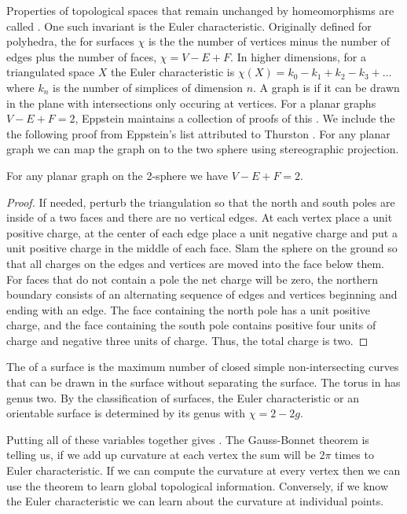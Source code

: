 Properties of topological spaces that remain unchanged by homeomorphisms are called
. One such invariant is the Euler characteristic.
Originally defined for polyhedra, the  for surfaces $\chi$ is the 
the number of vertices minus the number of edges plus  the number of faces, $\chi=V-E+F.$
In higher dimensions, for a triangulated space $X$ the Euler characteristic is 
$\chi(X)=k_0-k_1+k_2-k_3+\ldots$ where $k_n$ is the number of simplices of dimension $n.$
A  graph  is  if it can be drawn in the plane with intersections only occuring
at vertices.
For a planar graphs $V-E+F=2$, Eppstein maintains a collection of proofs of this \cite{eppstein-proofs}.
We include the the following proof from Eppstein's list attributed to Thurston
 \cite{thurston}. For any planar graph we can map the graph on to the two sphere
 using stereographic projection.
 
\begin{theorem}\label{thm:euler}
For any planar graph on the 2-sphere we have $V-E+F=2.$
\end{theorem}

\begin{proof}
If needed, perturb the triangulation so that the north and south poles are 
inside of a two faces and there are no vertical edges. At each vertex place a unit positive
charge, at the center of each edge place a unit negative charge and put a unit positive
charge in the middle of each face. Slam the sphere on the ground so that all charges
on the edges and vertices are moved into the face below them. For faces that do not contain a pole
the net charge will be zero, the northern boundary consists of an alternating sequence
of edges and vertices  beginning  and ending with an edge.
The face containing the north pole has a unit positive charge, and the face containing the south
pole contains positive four units of charge and negative three units of charge.
Thus, the total charge is two.

\end{proof}

The  of a surface is the maximum  number of closed simple
non-intersecting curves that can be drawn in the surface without separating
the surface.
The torus in  has genus two.
By the classification of surfaces, the Euler characteristic or an orientable surface
is determined by its genus with $\chi=2-2g$.

Putting all of these variables together gives .
The  Gauss-Bonnet theorem is  telling us, if we add up curvature
at each vertex the sum will be $2\pi$ times to Euler characteristic.
If we can compute the curvature at every vertex then we can use the theorem
to learn global topological information.
Conversely, if we know the Euler characteristic we can learn about the curvature
at individual points.
